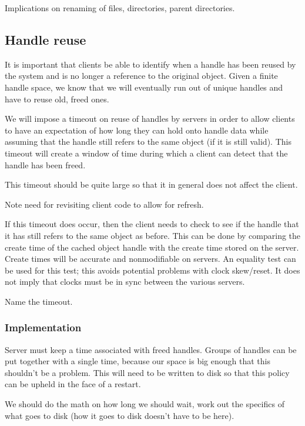 \documentclass[10pt]{article} %
\begin{document}
Implications on renaming of files, directories, parent directories.


%
%
\subsection{Handle reuse}

It is important that clients be able to identify when a handle has been reused
by the system and is no longer a reference to the original object.  Given a
finite handle space, we know that we will eventually run out of unique handles
and have to reuse old, freed ones.

We will impose a timeout on reuse of handles by servers in order to allow
clients to have an expectation of how long they can hold onto handle data
while assuming that the handle still refers to the same object (if it is still
valid).  This timeout will create a window of time during which a client can
detect that the handle has been freed.

This timeout should be quite large so that it in general does not affect the
client.

Note need for revisiting client code to allow for refresh.

If this timeout does occur, then the client needs to check to see if the
handle that it has still refers to the same object as before.  This can be
done by comparing the create time of the cached object handle with the create
time stored on the server.  Create times will be accurate and nonmodifiable on
servers.  An equality test can be used for this test; this avoids potential
problems with clock skew/reset.  It does not imply that clocks must be in sync
between the various servers.

Name the timeout.

\subsubsection{Implementation}

Server must keep a time associated with freed handles.  Groups of handles can
be put together with a single time, because our space is big enough that this
shouldn't be a problem.  This will need to be written to disk so that this
policy can be upheld in the face of a restart.

We should do the math on how long we should wait, work out the specifics of
what goes to disk (how it goes to disk doesn't have to be here).
\end{document}
